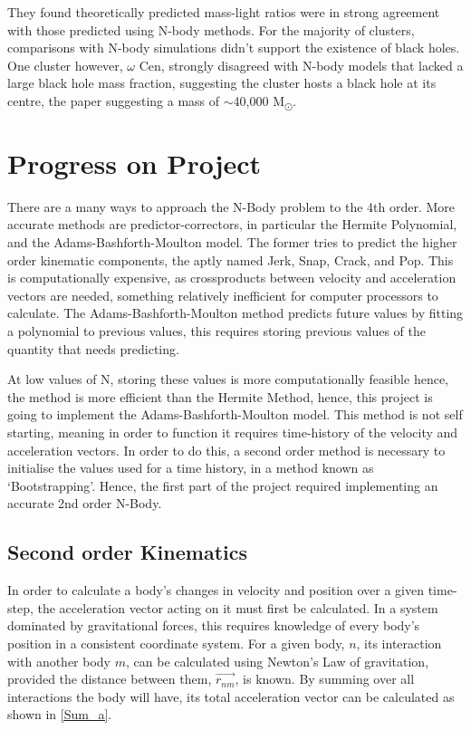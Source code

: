 \documentclass[a4paper,10pt]{article}
\begin{document}
They found theoretically predicted mass-light ratios were in strong agreement with those predicted using N-body methods. For the majority of clusters, comparisons with N-body simulations didn't support the existence of black holes. One cluster however, $\omega$ Cen, strongly disagreed with N-body models that lacked a large black hole mass fraction, suggesting the cluster hosts a black hole at its centre, the paper suggesting a mass of $\sim$40,000 M\textsubscript{\(\odot\)}.




\section{Progress on Project}

There are a many ways to approach the N-Body problem to the 4th order. More accurate methods are predictor-correctors, in particular the Hermite Polynomial, and the Adams-Bashforth-Moulton model. The former tries to predict the higher order kinematic components, the aptly named Jerk, Snap, Crack, and Pop. This is computationally expensive, as crossproducts between velocity and acceleration vectors are needed, something relatively inefficient for computer processors to calculate. The Adams-Bashforth-Moulton method predicts future values by fitting a polynomial to previous values, this requires storing previous values of the quantity that needs predicting. 

At low values of N, storing these values is more computationally feasible hence, the method is more efficient than the Hermite Method, hence, this project is going to implement the Adams-Bashforth-Moulton model. This method is not self starting, meaning in order to function it requires time-history of the velocity and acceleration vectors. In order to do this, a second order method is necessary to initialise the values used for a time history, in a method known as `Bootstrapping'. Hence, the first part of the project required implementing an accurate 2nd order N-Body. 

\subsection{Second order Kinematics}

In order to calculate a body's changes in velocity and position over a given time-step, the acceleration vector acting on it must first be calculated. In a system dominated by gravitational forces, this requires knowledge of every body's position in a consistent coordinate system. For a given body, $n$, its interaction with another body $m$, can be calculated using Newton's Law of gravitation, provided the distance between them, $\vec{r_{nm}}$, is known. By summing over all interactions the body will have, its total acceleration vector can be calculated as shown in \cref{Sum_a}.
\end{document}
